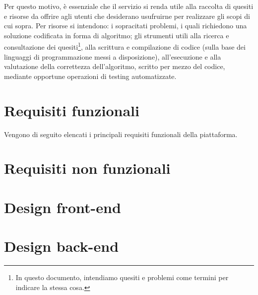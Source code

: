 \documentclass[11pt, a4paper]{article}
\begin{document}
Per questo motivo, è essenziale che il servizio si renda utile alla
raccolta di quesiti e risorse da offrire agli utenti che desiderano usufruirne
per realizzare gli scopi di cui sopra. Per risorse si intendono: i sopracitati
problemi, i quali richiedono una soluzione codificata in forma di algoritmo;
gli strumenti utili alla ricerca e consultazione dei
quesiti\footnote{In questo documento, intendiamo quesiti e problemi
come termini per indicare la stessa cosa.}, alla scrittura e
compilazione di codice (sulla base dei linguaggi di programmazione
messi a disposizione), all'esecuzione e alla valutazione della
correttezza dell'algoritmo, scritto per mezzo del codice, mediante
opportune operazioni di testing automatizzate.

\section{Requisiti funzionali}
Vengono di seguito elencati i principali requisiti funzionali della
piattaforma.



\section{Requisiti non funzionali}



\section{Design front-end}
\section{Design back-end}
\end{document}
